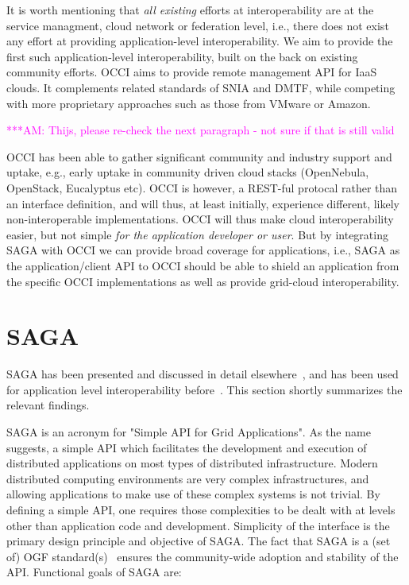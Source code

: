 \documentclass[10pt,conference,final,letterpaper,twoside,twocolumn,]{IEEEtran}
\newcommand{\amnote}[1]{  {\textcolor{magenta} {***AM: #1}}}
\newcommand{\amnote}[1]{}
\begin{document}
It is worth mentioning that {\it all existing} efforts at
interoperability are at the service managment, cloud network or
federation level, i.e., there does not exist any effort at providing
application-level interoperability. We aim to provide the first such
application-level interoperability, built on the back on existing
community efforts.  OCCI aims to provide remote management API for
IaaS clouds. It complements related standards of SNIA and DMTF, while
competing with more proprietary approaches such as those from VMware
or Amazon.  

\amnote{Thijs, please re-check the next paragraph - not sure if that
is still valid}

OCCI has been able to gather significant community and industry
support and uptake, e.g., early uptake in community driven cloud
stacks (OpenNebula, OpenStack, Eucalyptus etc).  OCCI is however, a
REST-ful protocal rather than an interface definition, and will thus,
at least initially, experience different, likely non-interoperable
implementations.  OCCI will thus make cloud interoperability easier,
but not simple {\it for the application developer or user}.  But by
integrating SAGA with OCCI we can provide broad coverage for
applications, i.e., SAGA as the application/client API to OCCI should
be able to shield an application from the specific OCCI
implementations as well as provide grid-cloud interoperability.


\section{SAGA}
\label{sec:saga}

 SAGA has been presented and discussed in detail
 elsewhere~\cite{sagapub...}, and has been used for application level
 interoperability before~\cite{sagainterop...}.  This section shortly
 summarizes the relevant findings.

 SAGA is an acronym for "Simple API for Grid Applications". As the
 name suggests, a simple API which facilitates the development and
 execution of distributed applications on most types of distributed
 infrastructure.  Modern distributed computing environments are very
 complex infrastructures, and allowing applications to make use of
 these complex systems is not trivial.  By defining a simple API, one
 requires those complexities to be dealt with at levels other than
 application code and development.  Simplicity of the interface is the
 primary design principle and objective of SAGA.  The fact that SAGA
 is a (set of) OGF standard(s)~\cite{sagaspecs...} ensures the
 community-wide adoption and stability of the API.  Functional goals
 of SAGA are:
\end{document}
